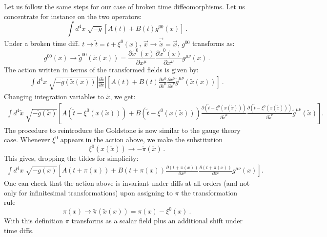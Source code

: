\documentclass[12pt,letterpaper]{article}
\begin{document}
{Let us follow the same steps for our case of broken time diffeomorphisms. Let us concentrate for instance on the two operators:
\begin{equation}
\int d^4x\;  \sqrt{-g} \left[A(t)+B(t)g^{00}(x)\right] \ .
\end{equation}
Under a broken time diff.  $t \to \widetilde t= t + \xi^0(x)$, $\vec{x} \to \vec{\widetilde{x}}=\vec{x}$,  $g^{00}$ transforms as:
\begin{equation}
g^{00}(x)\to \widetilde g^{00}(\widetilde x(x))=\frac{\partial \widetilde x^0(x)}{\partial x^\mu}\frac{\partial \widetilde x^0(x)}{\partial x^\nu} g^{\mu\nu}(x) \,  .
\end{equation}
The action written in terms of the transformed fields is given by:
\begin{eqnarray}
\int d^4x\;  \sqrt{-\widetilde g(\widetilde x(x))} \left|\frac{\partial \widetilde x}{\partial x} \right| \left[A(t)+B(t) \frac{\partial x^0}{\partial \widetilde x^\mu}\frac{\partial x^0}{\partial \widetilde x^\nu} \widetilde g^{\mu\nu}(\widetilde x(x))\right]\ .
\end{eqnarray}
Changing integration variables to $\widetilde x$, we get:
\begin{eqnarray}
\int d^4\widetilde x\;  \sqrt{-\widetilde g(\widetilde x)} \left[A(\widetilde t-\xi^0(x(\widetilde x)))+B(\widetilde t-\xi^0(x(\widetilde x))) \frac{\partial (\widetilde t-\xi^0(x(\widetilde x)))}{\partial \widetilde x^\mu}\frac{\partial (\widetilde t-\xi^0(x(\widetilde x)))}{\partial \widetilde x^\nu} \widetilde g^{\mu\nu}(\widetilde x)\right].
\end{eqnarray}
The procedure to reintroduce the Goldstone is now similar to the gauge theory case. Whenever $\xi^0$ appears in the action above, we make the substitution
\begin{equation} 
\xi^0(x(\widetilde x)) \to - \widetilde \pi(\widetilde x ) \, .
\end{equation}
This gives, dropping the tildes for simplicity:
\begin{eqnarray}
\int d^4x\;  \sqrt{- g(x)} \left[A( t+\pi(x))+B(t+\pi(x)) \frac{\partial (t+\pi(x))}{\partial x^\mu}\frac{\partial (t+\pi(x))}{\partial x^\nu} g^{\mu\nu}(x)\right].
\end{eqnarray}
One can check that the action above is invariant under diffs at all orders (and not only for infinitesimal transformations) upon assigning to $\pi$ the transformation rule
\begin{equation}
\pi(x) \to \widetilde\pi(\widetilde x(x))=\pi(x)-\xi^0(x) \ .
\end{equation}
With this definition $\pi$ transforms as a scalar field plus an additional shift under time diffs.

}
\end{document}
